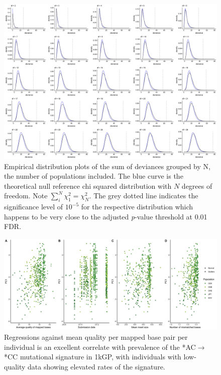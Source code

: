 \documentclass[9pt,lineno]{elife}
\begin{document}
\begin{figure}
\includegraphics[width=\hsize,keepaspectratio]{./Figures/AllDeviances.jpg}

\caption{Empirical distribution plots of the sum of deviances grouped by N, the number of populations included. The blue curve is the theoretical null reference chi squared distribution with $N$ degrees of freedom. Note $\sum_i^N  \chi^2_1= \chi^2_N$. The grey dotted line indicates the significance level of $10^{-5}$ for the respective distribution which happens to be very close to the adjusted \textit{p}-value threshold at 0.01 FDR. }
\label{Deviances}
\end{figure}

\begin{figure}
\includegraphics[width=\hsize,keepaspectratio]{./Figures/PC1_Correlation.jpg}
\caption{Regressions against mean quality per mapped base pair per individual is an excellent correlate with prevalence of the  *AC${\rightarrow}$*CC mutational signature in 1kGP, with individuals with low-quality data showing elevated rates of the signature.  }
\label{PC1_Correlation}
\end{figure}
\end{document}
